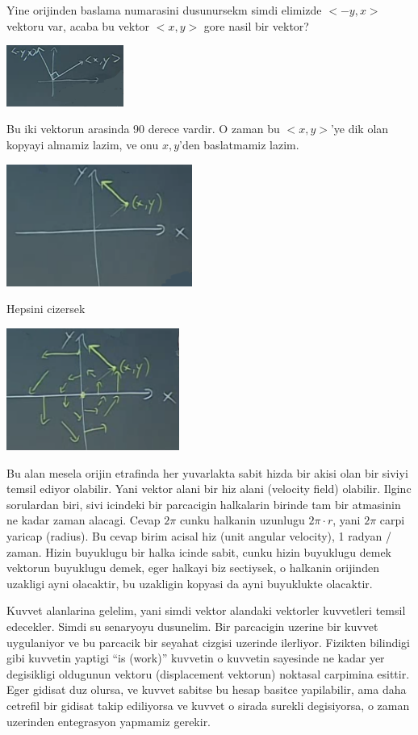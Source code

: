 \documentclass[12pt,fleqn]{article}
\begin{document}
Yine orijinden baslama numarasini dusunursekm simdi elimizde $<-y,x>$
vektoru var, acaba bu vektor $<x,y>$ gore nasil bir vektor? 

\includegraphics[height=2cm]{19_5.png}

Bu iki vektorun arasinda 90 derece vardir. O zaman bu $<x,y>$'ye dik olan
kopyayi almamiz lazim, ve onu $x,y$'den baslatmamiz lazim. 

\includegraphics[height=4cm]{19_6.png}

Hepsini cizersek

\includegraphics[height=4cm]{19_7.png}

Bu alan mesela orijin etrafinda her yuvarlakta sabit hizda bir akisi olan
bir siviyi temsil ediyor olabilir. Yani vektor alani bir hiz alani
(velocity field) olabilir. Ilginc sorulardan biri, sivi icindeki bir
parcacigin halkalarin birinde tam bir atmasinin ne kadar zaman
alacagi. Cevap $2\pi$ cunku halkanin uzunlugu $2\pi \cdot r$, yani $2\pi$
carpi yaricap (radius). Bu cevap birim acisal hiz (unit angular velocity),
1 radyan / zaman. Hizin buyuklugu bir halka icinde sabit, cunku hizin
buyuklugu demek vektorun buyuklugu demek, eger halkayi biz sectiysek, o
halkanin orijinden uzakligi ayni olacaktir, bu uzakligin kopyasi da ayni
buyuklukte olacaktir. 

Kuvvet alanlarina gelelim, yani simdi vektor alandaki vektorler kuvvetleri
temsil edecekler. Simdi su senaryoyu dusunelim. Bir parcacigin uzerine bir
kuvvet uygulaniyor ve bu parcacik bir seyahat cizgisi uzerinde
ilerliyor. Fizikten bilindigi gibi kuvvetin yaptigi ``is (work)'' kuvvetin
o kuvvetin sayesinde ne kadar yer degisikligi oldugunun vektoru
(displacement vektorun) noktasal carpimina esittir. Eger gidisat duz
olursa, ve kuvvet sabitse bu hesap basitce yapilabilir, ama daha cetrefil
bir gidisat takip ediliyorsa ve kuvvet o sirada surekli degisiyorsa, o
zaman uzerinden entegrasyon yapmamiz gerekir. 
\end{document}

